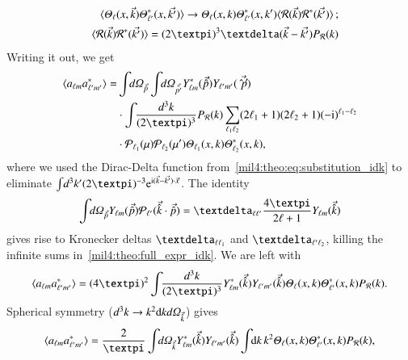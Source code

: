 \begin{equation}\label{mil4:theo:eq:substitution_idk}
\begin{split}
    \langle \Theta_\ell(x,\vec{k}) \Theta_{\ell'}^*(x,\vec{k'})\rangle \to \Theta_\ell(x,k) \Theta_{\ell'}^*(x,k') \langle \mathcal{R}(\vec{k}) \mathcal{R}^*(\vec{k'}) \rangle \,; \\
    \quad \langle \mathcal{R}(\vec{k}) \mathcal{R}^*(\vec{k'}) \rangle = (2\pi)^3 \diracdeltafunc{\vec{k}-\vec{k'}} P_\mathcal{R}(k) 
\end{split}
\end{equation}
Writing it out, we get
\begin{equation}\label{mil4:theo:full_expr_idk}
\begin{split}
    \langle a\ellm a^*\ellmp \rangle =&  \int \dOmg[p] \int \dOmg[p'] Y_{\ell m}^*(\vec{\hat{p}}) Y_{\ell' m'}(\vec{\hat{p}'})  \\
    &\cdot \int \dkkk P_\mathcal{R}(k)  \sum_{\ell_1 \ell_2} (2\ell_1 +1) (2\ell_2 +1) (-\im)^{\ell_1-\ell_2} \\
    &\cdot \mathcal{P}_{\ell_1}(\mu)\mathcal{P}_{\ell_2}(\mu')\Theta_{\ell_1}(x,k) \Theta^{*}_{\ell_2}(x,k) ,
\end{split}
\end{equation} 
where we used the Dirac-Delta function from~\cref{mil4:theo:eq:substitution_idk} to eliminate $\int \! d^3k' (2\pi)^{-3} \eu[\im (\vec{k}-\vec{k'})\cdot \vec{x}]$. The identity 
\begin{equation}
    \int \dOmg[p] Y\ellm (\vec{\hat{p}}) \mathcal{P}_{\ell'}(\vec{\hat{k}}\cdot \vec{\hat{p}}) = \kroneckerdelta{\ell \ell'} \frac{4\pi}{2\ell +1}Y\ellm (\vec{\hat{k}})
\end{equation}
gives rise to Kronecker deltas $\kroneckerdelta{\ell \ell_1}$ and $\kroneckerdelta{\ell' \ell_2}$, killing the infinite sums in~\cref{mil4:theo:full_expr_idk}. We are left with
\begin{equation}
    \langle a\ellm a^*\ellmp \rangle =  (4\pi)^2 \int \dkkk Y_{\ell m}^*(\vec{\hat{k}}) Y_{\ell' m'}(\vec{\hat{k}})  \Theta_{\ell}(x,k) \Theta^{*}_{\ell'}(x,k) P_\mathcal{R}(k).
\end{equation}
Spherical symmetry ($d^3k \to k^2 \, \dx{k} \,\dOmg[k]$) gives 
\begin{equation}
    \langle a\ellm a^*\ellmp \rangle = \frac{2}{\pi} \int \dOmg[k] Y_{\ell m}^\ast(\vec{\hat{k}}) Y_{\ell' m'}(\vec{\hat{k}}) \int \dx{k} k^2  \Theta_{\ell}(x,k) \Theta^{*}_{\ell'}(x,k)  P_\mathcal{R}(k),
\end{equation}
